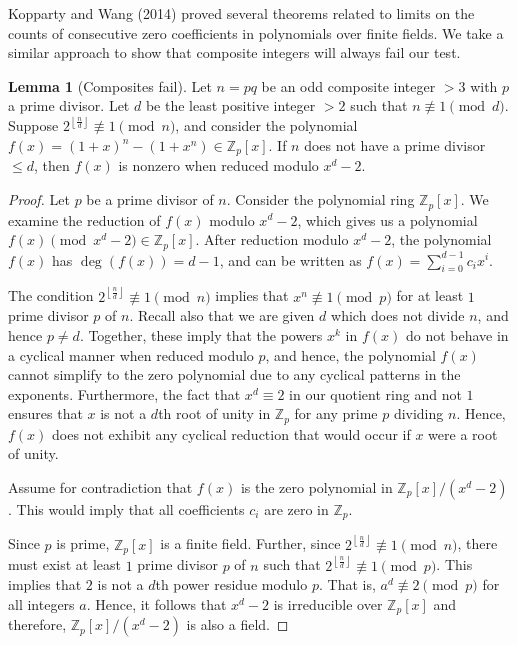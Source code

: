 \documentclass{article}
\theoremstyle{plain}
\theoremstyle{definition}
\newtheorem{lemma}{Lemma}
\begin{document}
Kopparty and Wang (2014) \cite{koppartywang2014roots} proved several theorems related to limits on the counts of consecutive zero coefficients in polynomials over finite fields. We take a similar approach to show that composite integers will always fail our test.

\begin{lemma}[Composites fail] \label{lemma:composites}
Let $n = pq$ be an odd composite integer $>3$ with $p$ a prime divisor. Let $d$ be the least positive integer $>2$ such that $n \not\equiv 1 \pmod{d}$. Suppose $2^{\left\lfloor\frac{n}{d}\right\rfloor} \not\equiv 1 \pmod{n}$, and consider the polynomial $f(x) = (1 + x)^n - (1 + x^n) \in \mathbb{Z}_p[x]$. If $n$ does not have a prime divisor $\leq d$, then $f(x)$ is nonzero when reduced modulo $x^d - 2$.
\end{lemma}
\begin{proof}
Let $p$ be a prime divisor of $n$. Consider the polynomial ring $\mathbb{Z}_p[x]$. We examine the reduction of $ f(x) $ modulo $x^d - 2$, which gives us a polynomial $f(x) \pmod{x^d - 2} \in \mathbb{Z}_p[x]$. After reduction modulo $x^d - 2$, the polynomial $f(x)$ has $\deg(f(x)) = d-1$, and can be written as $f(x) = \sum_{i=0}^{d-1} c_i x^i$.

The condition $2^{\left\lfloor\frac{n}{d}\right\rfloor} \not\equiv 1 \pmod{n}$ implies that $x^n \not\equiv 1 \pmod{p}$ for at least $1$ prime divisor $p$ of $n$. Recall also that we are given $d$ which does not divide $n$, and hence $p \not= d$. Together, these imply that the powers $x^k$ in $f(x)$ do not behave in a cyclical manner when reduced modulo $p$, and hence, the polynomial $f(x)$ cannot simplify to the zero polynomial due to any cyclical patterns in the exponents. Furthermore, the fact that $x^d \equiv 2$ in our quotient ring and not $1$ ensures that $x$ is not a $d$th root of unity in $\mathbb{Z}_p$ for any prime $p$ dividing $n$. Hence, $f(x)$ does not exhibit any cyclical reduction that would occur if $x$ were a root of unity.

Assume for contradiction that $f(x)$ is the zero polynomial in $\mathbb{Z}_p[x]/(x^d - 2)$. This would imply that all coefficients $c_i$ are zero in $\mathbb{Z}_p$.

Since $p$ is prime, $\mathbb{Z}_p[x]$ is a finite field. Further, since $2^{\left\lfloor\frac{n}{d}\right\rfloor} \not\equiv 1 \pmod{n}$, there must exist at least $1$ prime divisor $p$ of $n$ such that $2^{\left\lfloor\frac{n}{d}\right\rfloor} \not\equiv 1 \pmod{p}$. This implies that $2$ is not a $d$th power residue modulo $p$. That is, $a^d \not\equiv 2 \pmod{p}$ for all integers $a$. Hence, it follows that $x^d - 2$ is irreducible over $\mathbb{Z}_p[x]$ and therefore, $\mathbb{Z}_p[x]/(x^d - 2)$ is also a field.


\end{proof}
\end{document}
